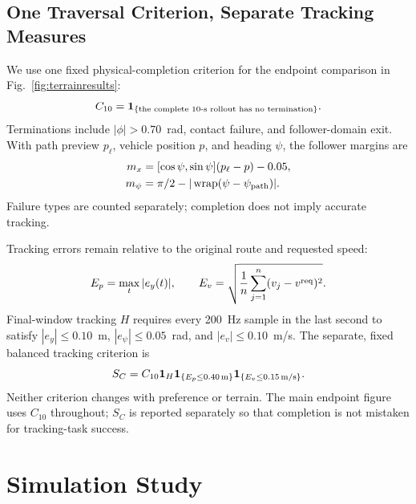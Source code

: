 \documentclass[journal]{IEEEtran}
\begin{document}
\subsection{One Traversal Criterion, Separate Tracking Measures}
We use one fixed physical-completion criterion for the endpoint comparison in Fig.~\ref{fig:terrainresults}:
\begin{equation}
 C_{10}=\mathbf1_{\{\text{the complete 10-s rollout has no termination}\}}.
 \label{eq:completion}
\end{equation}
Terminations include $|\phi|>0.70$~rad, contact failure, and follower-domain exit. With path preview $p_\ell$, vehicle position $p$, and heading $\psi$, the follower margins are
\begin{equation}
\begin{split}
 m_x&=[\cos\psi,\sin\psi](p_\ell-p)-0.05,\\
 m_\psi&=\pi/2-|\operatorname{wrap}(\psi-\psi_{\rm path})|.
\end{split}
 \label{eq:domain}
\end{equation}
Failure types are counted separately; completion does not imply accurate tracking.

Tracking errors remain relative to the original route and requested speed:
\begin{equation}
 E_p=\max_t|e_y(t)|,\qquad
 E_v=\sqrt{\frac{1}{n}\sum_{j=1}^n(v_j-v^{\rm req})^2}.
 \label{eq:metrics}
\end{equation}
Final-window tracking $H$ requires every 200~Hz sample in the last second to satisfy $|e_y|\leq0.10$~m, $|e_\psi|\leq0.05$~rad, and $|e_v|\leq0.10$~m/s. The separate, fixed balanced tracking criterion is
\begin{equation}
 S_C=C_{10}\mathbf1_H\mathbf1_{\{E_p\leq0.40\,\mathrm m\}}
                    \mathbf1_{\{E_v\leq0.15\,\mathrm{m/s}\}}.
 \label{eq:success}
\end{equation}
Neither criterion changes with preference or terrain. The main endpoint figure uses $C_{10}$ throughout; $S_C$ is reported separately so that completion is not mistaken for tracking-task success.

\section{Simulation Study}
\end{document}
